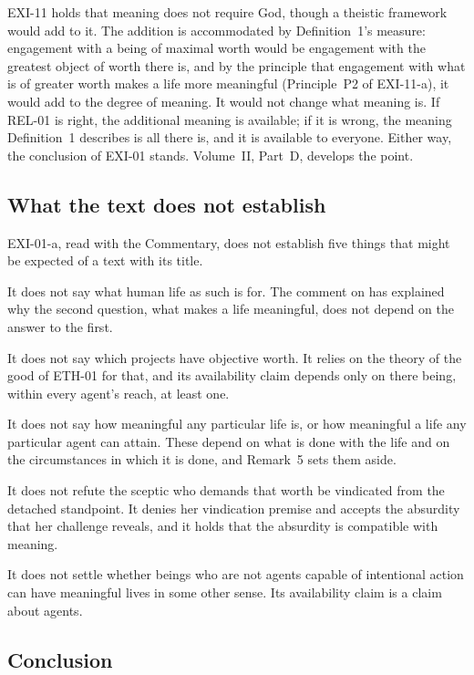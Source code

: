 \begin{reply}
EXI-11 holds that meaning does not require God, though a theistic framework would add to it. The addition is accommodated by Definition~1's measure: engagement with a being of maximal worth would be engagement with the greatest object of worth there is, and by the principle that engagement with what is of greater worth makes a life more meaningful (Principle~P2 of EXI-11-a), it would add to the degree of meaning. It would not change what meaning is. If REL-01 is right, the additional meaning is available; if it is wrong, the meaning Definition~1 describes is all there is, and it is available to everyone. Either way, the conclusion of EXI-01 stands. Volume~II, Part~D, develops the point.
\end{reply}

\subsection{What the text does not establish}

EXI-01-a, read with the Commentary, does not establish five things that might be expected of a text with its title.

It does not say what human life as such is for. The comment on  has explained why the second question, what makes a life meaningful, does not depend on the answer to the first.

It does not say which projects have objective worth. It relies on the theory of the good of ETH-01 for that, and its availability claim depends only on there being, within every agent's reach, at least one.

It does not say how meaningful any particular life is, or how meaningful a life any particular agent can attain. These depend on what is done with the life and on the circumstances in which it is done, and Remark~5 sets them aside.

It does not refute the sceptic who demands that worth be vindicated from the detached standpoint. It denies her vindication premise and accepts the absurdity that her challenge reveals, and it holds that the absurdity is compatible with meaning.

It does not settle whether beings who are not agents capable of intentional action can have meaningful lives in some other sense. Its availability claim is a claim about agents.

\subsection{Conclusion}

